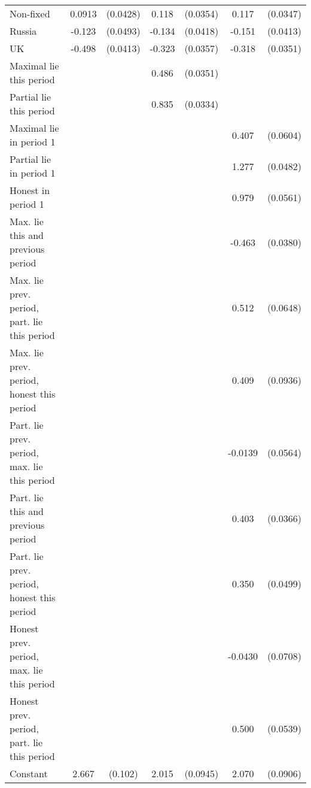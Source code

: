 {\begin{tabular}{l*{3}{cc}}
Non-fixed       &   0.0913\sym{**} & (0.0428)&    0.118\sym{***}& (0.0354)&    0.117\sym{***}& (0.0347)\\
Russia          &   -0.123\sym{**} & (0.0493)&   -0.134\sym{***}& (0.0418)&   -0.151\sym{***}& (0.0413)\\
UK              &   -0.498\sym{***}& (0.0413)&   -0.323\sym{***}& (0.0357)&   -0.318\sym{***}& (0.0351)\\
Maximal lie this period&                  &         &    0.486\sym{***}& (0.0351)&                  &         \\
Partial lie this period&                  &         &    0.835\sym{***}& (0.0334)&                  &         \\
Maximal lie in period 1&                  &         &                  &         &    0.407\sym{***}& (0.0604)\\
Partial lie in period 1&                  &         &                  &         &    1.277\sym{***}& (0.0482)\\
Honest in period 1&                  &         &                  &         &    0.979\sym{***}& (0.0561)\\
Max. lie this and previous period&                  &         &                  &         &   -0.463\sym{***}& (0.0380)\\
Max. lie prev. period, part. lie this period&                  &         &                  &         &    0.512\sym{***}& (0.0648)\\
Max. lie prev. period, honest this period&                  &         &                  &         &    0.409\sym{***}& (0.0936)\\
Part. lie prev. period, max. lie this period&                  &         &                  &         &  -0.0139         & (0.0564)\\
Part. lie this and previous period&                  &         &                  &         &    0.403\sym{***}& (0.0366)\\
Part. lie prev. period, honest this period&                  &         &                  &         &    0.350\sym{***}& (0.0499)\\
Honest prev. period, max. lie this period&                  &         &                  &         &  -0.0430         & (0.0708)\\
Honest prev. period, part. lie this period&                  &         &                  &         &    0.500\sym{***}& (0.0539)\\
Constant        &    2.667\sym{***}&  (0.102)&    2.015\sym{***}& (0.0945)&    2.070\sym{***}& (0.0906)\\

\end{tabular}}
